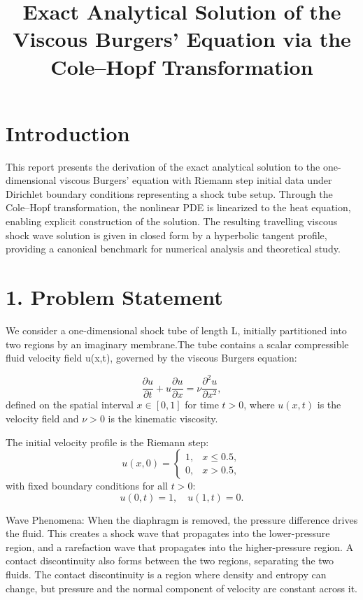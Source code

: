 \documentclass[12pt]{article}
\title{Exact Analytical Solution of the Viscous Burgers' Equation via the Cole--Hopf Transformation}
\author{}
\date{}
\begin{document}
\maketitle

\section*{Introduction}



This report presents the derivation of the exact analytical solution to the one-dimensional viscous Burgers' equation with Riemann step initial data under Dirichlet boundary conditions representing a shock tube setup. Through the Cole--Hopf transformation, the nonlinear PDE is linearized to the heat equation, enabling explicit construction of the solution. The resulting travelling viscous shock wave solution is given in closed form by a hyperbolic tangent profile, providing a canonical benchmark for numerical analysis and theoretical study.

\vspace{12pt}

\section*{1. Problem Statement}

We consider a one-dimensional shock tube of length L, initially partitioned into two regions by an imaginary membrane.The tube contains a scalar compressible fluid velocity field u(x,t), governed by the viscous Burgers equation:

\begin{equation}
\label{eq:burgers}
\frac{\partial u}{\partial t} + u \frac{\partial u}{\partial x} = \nu \frac{\partial^2 u}{\partial x^2},
\end{equation}
defined on the spatial interval \(x \in [0,1]\) for time \(t > 0\), where \(u(x,t)\) is the velocity field and \(\nu > 0\) is the kinematic viscosity.

The initial velocity profile is the Riemann step:
\[
u(x,0) = \begin{cases}
1, & x \le 0.5, \\[6pt]
0, & x > 0.5,
\end{cases}
\]
with fixed boundary conditions for all \(t>0\):
\[
u(0,t) = 1, \quad u(1,t) = 0.
\]

\vspace{12pt}

Wave Phenomena: When the diaphragm is removed, the pressure difference drives the fluid.
This creates a shock wave that propagates into the lower-pressure region, and a rarefaction
wave that propagates into the higher-pressure region. A contact discontinuity also forms
between the two regions, separating the two fluids.
The contact discontinuity is a region where density and entropy can change, but pressure
and the normal component of velocity are constant across it.
\end{document}
